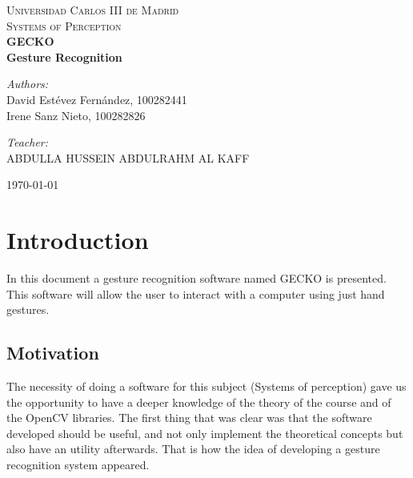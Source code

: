 \documentclass{article}
\begin{document}
\begin{titlepage}

\begin{center}
\textsc{\LARGE Universidad Carlos III de Madrid}\\[0.5cm]
\textsc{\Large Systems of Perception}\\[4cm]


{\Huge \bfseries{GECKO\\[1cm] Gesture Recognition}\\[8cm]}


\begin{minipage}{0.55\textwidth}
\begin{flushleft} \large
\emph{Authors:}\\
David Estévez Fernández, 100282441\\
Irene Sanz Nieto, 100282826\\
\end{flushleft}
\end{minipage}
\begin{minipage}{0.4\textwidth}
\begin{flushright} \large
\emph{Teacher:}\\
ABDULLA HUSSEIN ABDULRAHM AL KAFF
\end{flushright}\end{minipage}\vfill

{\large \today}

\end{center}
\end{titlepage}

%
\newpage
%
\tableofcontents
\newpage

\section{Introduction}
In this document a gesture recognition software named GECKO is presented. This software will allow the user to interact with a computer using just hand gestures. 

\subsection{Motivation}
The necessity of doing a software for this subject (Systems of perception) gave us the opportunity to have a deeper knowledge of the theory of the course and of the OpenCV libraries. The first thing that was clear was that the software developed should be useful, and not only implement the theoretical concepts but also have an utility afterwards. That is how the idea of developing a gesture recognition system appeared. 
\end{document}
